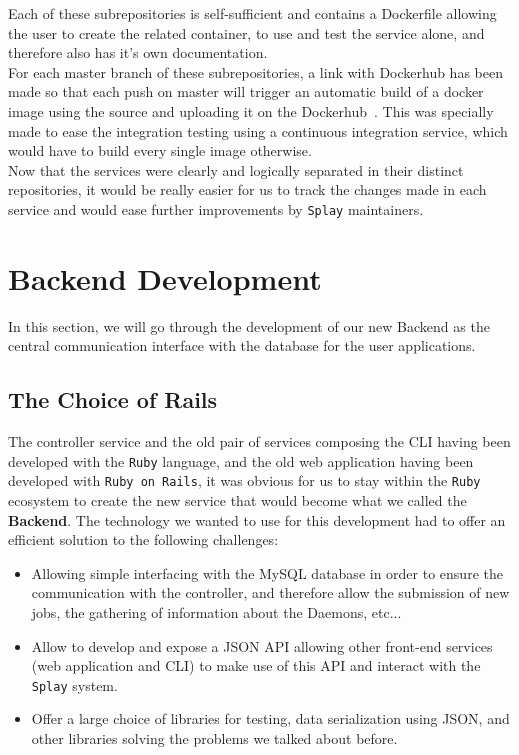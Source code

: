 \documentclass{eplmastersthesis}
\begin{document}
        Each of these subrepositories is self-sufficient and contains a Dockerfile
        allowing the user to create the related container, to use and test
        the service alone, and therefore also has it's own documentation.\\

        For each master branch of these subrepositories, a link with Dockerhub
        has been made so that each push on master will trigger an automatic build
        of a docker image using the source and uploading it on the Dockerhub~\cite{DockerHubGithub}.
        This was specially made to ease the integration testing using a
        continuous integration service, which would have to build every single
        image otherwise.\\

        Now that the services were clearly and logically separated in their
        distinct repositories, it would be really easier for us to track
        the changes made in each service and would ease further improvements
        by \texttt{Splay} maintainers.

    \section{Backend Development}

      In this section, we will go through the development of our new Backend
      as the central communication interface with the database for the user
      applications.\\

      \subsection{The Choice of Rails}

        The controller service and the old pair of services composing the CLI
        having been developed with the \texttt{Ruby} language, and the old web
        application having been developed with \texttt{Ruby on Rails}, it was obvious
        for us to stay within the \texttt{Ruby} ecosystem to create the new service
        that would become what we called the \textbf{Backend}. The technology
        we wanted to use for this development had to offer an efficient
        solution to the following challenges:

        \begin{itemize}
          \item Allowing simple interfacing with the MySQL database in order
          to ensure the communication with the controller, and therefore allow
          the submission of new jobs, the gathering of information about the
          Daemons, etc...
          \item Allow to develop and expose a JSON API allowing other front-end
          services (web application and CLI) to make use of this API and
          interact with the \texttt{Splay} system.
          \item Offer a large choice of libraries for testing, data
          serialization using JSON, and other libraries solving the problems
          we talked about before.
        \end{itemize}
\end{document}
